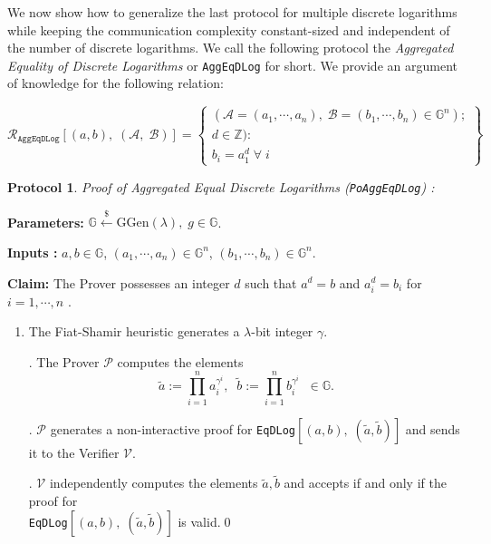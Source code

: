 \documentclass[11pt, lettersize, notitlepage, leqno, footskip=0.6cm]{article}
\newcommand{\ttt}{\texttt}
\newcommand{\wti}{\widetilde}
\newcommand{\mc}{\mathcal}
\newcommand{\mb}{\mathbb}
\newcommand{\mr}{\mathrm}
\newcommand{\lam}{\lambda}
\newcommand{\lamb}{\lambda}
\newcommand{\vs}{\vspace{-0.15cm}}
\newtheorem{Prot}[Thm]{Protocol}
\numberwithin{equation}{section}
\begin{document}
{\noindent We now show how to generalize the last protocol for multiple discrete logarithms while keeping the communication complexity constant-sized and independent of the number of discrete logarithms. We call the following protocol the \textit{Aggregated Equality of Discrete Logarithms} or \verb|AggEqDLog| for short. We provide an argument of knowledge for  the following relation:

\[
  \mc{R}_{{\ttt{AggEqDLog}}}[(a, b),\;(\mc{A},\;\mc{B})] = \left\{\begin{array}{l}
    (\mc{A} = (a_1, \cdots, a_n),\;\mc{B} = (b_1,\cdots, b_n)\in\mb{G}^n);\\
    d\in\mb{Z}): \\
    b_i = a_1^{d} \;\forall\;i
  \end{array}\right\}
\]

\vspace{0.1cm}

\begin{Prot} \normalfont \textit{Proof of Aggregated Equal Discrete Logarithms} (\verb|PoAggEqDLog|) :\end{Prot} \vspace{-0.3cm}

\noindent \textbf{Parameters:} $\mb{G}\xleftarrow{\$} \mr{GGen}(\lamb), \; g\in \mb{G}$.

\noindent \textbf{Inputs :} $a,b\in\mb{G}$, $(a_1, \cdots, a_n)\in\mb{G}^n$, $(b_1, \cdots, b_n)\in\mb{G}^n$.


\noindent \textbf{Claim:} The Prover possesses an integer $d$ such that $a^d = b$ and $a_i^d = b_i$ for $i = 1,\cdots, n$ .

\begin{enumerate}[wide, labelwidth=!, labelindent=0pt]\vs \item The Fiat-Shamir heuristic generates a $\lam$-bit integer $\gamma$.

. The Prover $\mc{P}$ computes the elements \vspace{-0.15cm}$$\wti{a}:= \prod\limits_{i=1}^n a_i^{\gamma^i}, \;\;\wti{b}:= \prod\limits_{i=1}^n b_i^{\gamma^i}\;\; \in \mb{G}.$$

. $\mc{P}$ generates a non-interactive proof for \verb|EqDLog|$[(a, b),\; (\wti{a}, \wti{b})]$ and sends it to the Verifier $\mc{V}$.

. $\mc{V}$ independently computes the elements $\wti{a}, \wti{b}$ and accepts if and only if the proof for\\ \verb|EqDLog|$[(a, b),\; (\wti{a}, \wti{b})]$ is valid.\qed \end{enumerate}
\vspace{0.1cm}

}
\end{document}
